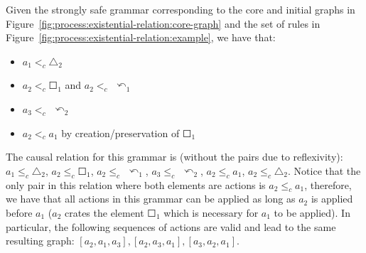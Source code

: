 \begin{example}\label{ex:process:existential-relation} Given the strongly safe grammar corresponding to the core and initial graphs in Figure~\ref{fig:process:existential-relation:core-graph} and the set of rules in Figure~\ref{fig:process:existential-relation:example}, we have that:

\begin{itemize}
  \item $a_1 <_c \triangle_2$
  \item $a_2 <_c \Square_1$ and $a_2 <_c$ $\curvearrowleft_1$
  \item $a_3 <_c$ $\curvearrowleft_2$
  \item $a_2 <_c a_1$ by creation/preservation of $\Square_1$
\end{itemize}

  The causal relation for this grammar is (without the pairs due to reflexivity): $a_1 \leq_c \triangle_2$, $a_2 \leq_c \Square_1$, $a_2 \leq_c$ $\curvearrowleft_1$, $a_3 \leq_c$ $\curvearrowleft_2$, $a_2 \leq_c a_1$, $a_2 \leq_c \triangle_2$. Notice that the only pair in this relation where both elements are actions is \mbox{$a_2 \leq_c a_1$}, therefore, we have that all actions in this grammar can be applied as long as $a_2$ is applied before $a_1$ ($a_2$ crates the element $\Square_1$
  which is necessary for $a_1$ to be applied). In particular, the following sequences of actions are valid and lead to the same resulting graph: $[a_2,a_1,a_3],[a_2,a_3,a_1],[a_3,a_2,a_1]$.


\end{example}
